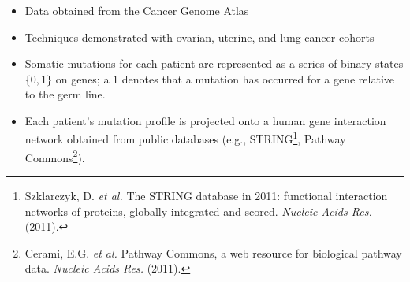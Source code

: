 \begin{frame}[fragile] \frametitle{}
    \begin{itemize}
        \item Data obtained from the Cancer Genome Atlas
        \item Techniques demonstrated with ovarian, uterine, and lung cancer
            cohorts
        \item Somatic mutations for each patient are represented as a series
            of binary states $\{0, 1\}$ on genes; a $1$ denotes that a mutation
            has occurred for a gene relative to the germ line.
        \item Each patient's mutation profile is projected onto a human gene
            interaction network obtained from public databases (e.g., 
            STRING\footnote{
                Szklarczyk, D. \textit{et al.} The STRING database in 2011:
                functional interaction networks of proteins, globally
                integrated and scored. \textit{Nucleic Acids Res.} (2011).},
            Pathway Commons\footnote{
                Cerami, E.G. \textit{et al.}
                Pathway Commons, a web resource for biological pathway data.
                \textit{Nucleic Acids Res.} (2011).\vspace{0.2cm}}).
    \end{itemize}
\end{frame}
%
